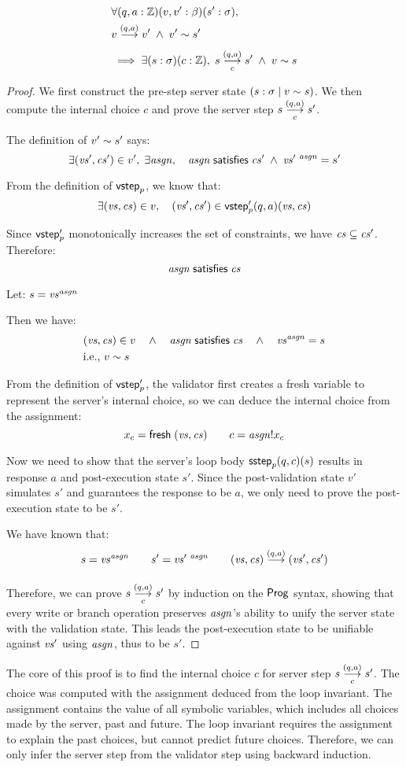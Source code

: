 \begin{lemma}[\ref{eq:rc2}]
\begin{align*}
&\forall(q,a:\Int)(v,v':\beta)(s':\sigma),\\
&\behaves v{(q,a)}v'\;\wedge\;\Reflects{v'}{s'}\\
&\implies\exists(s:\sigma)(c:\Int),\;\triggers sc{(q,a)}s'\;\wedge\;\Reflects{v}{s}
\end{align*}
\begin{proof}
We first construct the pre-step server state $(s:\sigma\mid v\sim s)$.
We then compute the internal choice $c$ and prove the server step $\triggers
sc{(q,a)}s'$.

The definition of $v'\sim s'$ says:
\[\exists (\mathit{vs}',\mathit{cs}')\in v',\;\exists \mathit{asgn},\quad \mathit{asgn}\;\mathsf{satisfies}\;\mathit{cs}'\;\wedge\;\mathit{vs}'^{~\mathit{asgn}}=s'\]

From the definition of $\mathsf{vstep}_p$, we know that:
\[\exists (\mathit{vs},\mathit{cs})\in v,\quad (\mathit{vs}',\mathit{cs}')\in\mathsf{vstep}'_p(q,a)(\mathit{vs},\mathit{cs})\]

Since $\mathsf{vstep}'_p$ monotonically increases the set of constraints, we have
$\mathit{cs}\subseteq \mathit{cs}'$.  Therefore: \[\mathit{asgn}\;\mathsf{satisfies}\;\mathit{cs}\]

Let: \(s=\mathit{vs}^{\mathit{asgn}}\)

Then we have:
\begin{align*}
&(\mathit{vs},\mathit{cs})\in v\quad\wedge\quad\mathit{asgn}\;\mathsf{satisfies}\;\mathit{cs}\quad\wedge\quad \mathit{vs}^{\mathit{asgn}}=s\\
&\text{i.e.}\text{, }v\sim s
\end{align*}

From the definition of $\mathsf{vstep}'_p$, the validator first creates a fresh variable
to represent the server's internal choice, so we can deduce the internal choice
from the assignment:
\[x_c=\mathsf{fresh}\;(\mathit{vs},\mathit{cs})\qquad c=\mathit{asgn}!x_c\]

Now we need to show that the server's loop body $\mathsf{sstep}_p(q,c)(s)$ results in
response $a$ and post-execution state $s'$.  Since the post-validation state
$v'$ simulates $s'$ and guarantees the response to be $a$, we only need to prove
the post-execution state to be $s'$.

We have known that:
\[s=\vs^\asgn\qquad s'=\vs'^{~\asgn}\qquad\behaves{(\vs,\cs)}{(q,a)}{(\vs',\cs')}\]

Therefore, we can prove $\triggers sc{(q,a)}s'$ by induction on the $\mathsf{Prog}$
syntax, showing that every write or branch operation preserves $\mathit{asgn}$'s ability
to unify the server state with the validation state.  This leads the
post-execution state to be unifiable against $\mathit{vs}'$ using $\mathit{asgn}$, thus to be
$s'$.
\end{proof}

The core of this proof is to find the internal choice $c$ for server step
$\triggers sc{(q,a)}s'$.  The choice was computed with the assignment deduced
from the loop invariant.  The assignment contains the value of all symbolic
variables, which includes all choices made by the server, past and future.  The
loop invariant requires the assignment to explain the past choices, but cannot
predict future choices.  Therefore, we can only infer the server step from the
validator step using backward induction.
\end{lemma}

